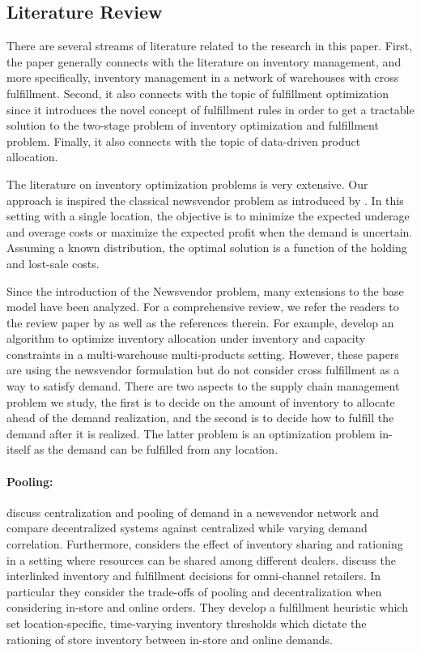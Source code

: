 \documentclass[poms,final,blindrev]{poms1_V1} %
\begin{document}
\subsection{Literature Review}

There are several streams of literature related to the research in this paper. First, the paper generally connects with the literature on inventory management, and more specifically, inventory management in a network of warehouses with cross fulfillment. Second, it also connects with the topic of fulfillment optimization since it introduces the novel concept of fulfillment rules in order to get a tractable solution to the two-stage problem of inventory optimization and fulfillment problem. Finally, it also connects with the topic of data-driven product allocation. 


The literature on inventory optimization problems is very extensive. Our approach is inspired the classical newsvendor problem as introduced by \cite{arrow1951optimal}. In this setting with a single location, the objective is to minimize the expected underage and overage costs or maximize the expected profit when the demand is uncertain. Assuming a known distribution, the optimal solution is a function of the holding and lost-sale costs.

Since the introduction of the Newsvendor problem, many extensions to the base model have been analyzed. For a comprehensive review, we refer the readers to the review paper by \cite{qin2011newsvendor} as well as the references therein. 
For example, \cite{perakis2020leveraging} develop an algorithm to optimize inventory allocation under inventory and capacity constraints in a multi-warehouse multi-products setting. %
However, these  papers are using the newsvendor formulation but do not  consider cross fulfillment as a way to satisfy demand.
There are two aspects to the supply chain management problem we study, the first is to decide on the amount of inventory to allocate ahead of the demand realization, and the second is to decide how to fulfill the demand after it is realized. The latter problem is an optimization problem in-itself as the demand can be fulfilled from any location. 

\paragraph{Pooling:} \cite{eppen1979note} discuss centralization and pooling of demand in a newsvendor network and compare decentralized systems against centralized while varying demand correlation. Furthermore, \cite{zhao2005inventory} considers the effect of inventory sharing and rationing in a setting where resources can be shared among different dealers. \cite{govindarajan2021joint}
discuss the interlinked inventory and fulfillment decisions for omni-channel retailers. In particular they consider the trade-offs of pooling and decentralization when considering in-store and online orders. They develop a fulfillment heuristic which set location-specific, time-varying inventory thresholds which dictate the rationing of store inventory between in-store and online demands. 
\end{document}
